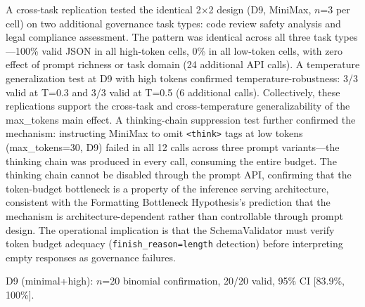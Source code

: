 \documentclass[11pt,a4paper]{article}
\begin{document}
A cross-task replication tested the identical 2$\times$2 design (D9, MiniMax, $n$=3 per cell) on two additional governance task types: code review safety analysis and legal compliance assessment. The pattern was identical across all three task types---100\% valid JSON in all high-token cells, 0\% in all low-token cells, with zero effect of prompt richness or task domain (24 additional API calls). A temperature generalization test at D9 with high tokens confirmed temperature-robustness: 3/3 valid at T=0.3 and 3/3 valid at T=0.5 (6 additional calls). Collectively, these replications support the cross-task and cross-temperature generalizability of the max\_tokens main effect. A thinking-chain suppression test further confirmed the mechanism: instructing MiniMax to omit \texttt{<think>} tags at low tokens (max\_tokens=30, D9) failed in all 12 calls across three prompt variants---the thinking chain was produced in every call, consuming the entire budget. The thinking chain cannot be disabled through the prompt API, confirming that the token-budget bottleneck is a property of the inference serving architecture, consistent with the Formatting Bottleneck Hypothesis's prediction that the mechanism is architecture-dependent rather than controllable through prompt design. The operational implication is that the SchemaValidator must verify token budget adequacy (\texttt{finish\_reason=length} detection) before interpreting empty responses as governance failures.

\begin{table}[htbp]\centering\caption{2$\times$2 Factorial: Prompt Richness $\times$ Token Budget (DeepSeek)}\label{tab:ds2x2}\small\vspace{2pt} {\footnotesize D9 (minimal+high): $n$=20 binomial confirmation, 20/20 valid, 95\% CI [83.9\%, 100\%].}
\end{table}

\begin{table}[htbp]\centering\caption{2$\times$2 Factorial: Prompt Richness $\times$ Token Budget (MiniMax)}\label{tab:mm2x2}\small
{}
\end{table}
\end{document}
